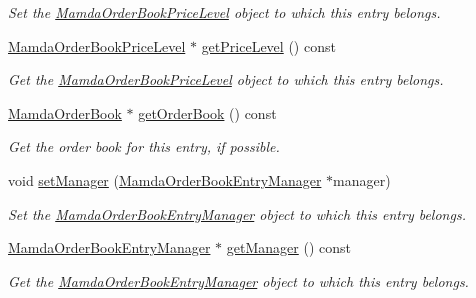 \begin{CompactItemize}
\begin{CompactList}\small\item\em Set the \hyperlink{classWombat_1_1MamdaOrderBookPriceLevel}{Mamda\-Order\-Book\-Price\-Level} object to which this entry belongs. \item\end{CompactList}\item 
\hyperlink{classWombat_1_1MamdaOrderBookPriceLevel}{Mamda\-Order\-Book\-Price\-Level} $\ast$ \hyperlink{classWombat_1_1MamdaOrderBookEntry_f150c5dddafcd155d418db41239d2f7c}{get\-Price\-Level} () const 
\begin{CompactList}\small\item\em Get the \hyperlink{classWombat_1_1MamdaOrderBookPriceLevel}{Mamda\-Order\-Book\-Price\-Level} object to which this entry belongs. \item\end{CompactList}\item 
\hyperlink{classWombat_1_1MamdaOrderBook}{Mamda\-Order\-Book} $\ast$ \hyperlink{classWombat_1_1MamdaOrderBookEntry_253ddeced9d61df56ddbc7b68cfdabf4}{get\-Order\-Book} () const 
\begin{CompactList}\small\item\em Get the order book for this entry, if possible. \item\end{CompactList}\item 
void \hyperlink{classWombat_1_1MamdaOrderBookEntry_7892c5a0b18aaae44b0a33d5696881a3}{set\-Manager} (\hyperlink{classWombat_1_1MamdaOrderBookEntryManager}{Mamda\-Order\-Book\-Entry\-Manager} $\ast$manager)
\begin{CompactList}\small\item\em Set the \hyperlink{classWombat_1_1MamdaOrderBookEntryManager}{Mamda\-Order\-Book\-Entry\-Manager} object to which this entry belongs. \item\end{CompactList}\item 
\hyperlink{classWombat_1_1MamdaOrderBookEntryManager}{Mamda\-Order\-Book\-Entry\-Manager} $\ast$ \hyperlink{classWombat_1_1MamdaOrderBookEntry_3f55243859e0552706d4ac6bfa762a36}{get\-Manager} () const 
\begin{CompactList}\small\item\em Get the \hyperlink{classWombat_1_1MamdaOrderBookEntryManager}{Mamda\-Order\-Book\-Entry\-Manager} object to which this entry belongs. \item\end{CompactList}\item 

\end{CompactItemize}
